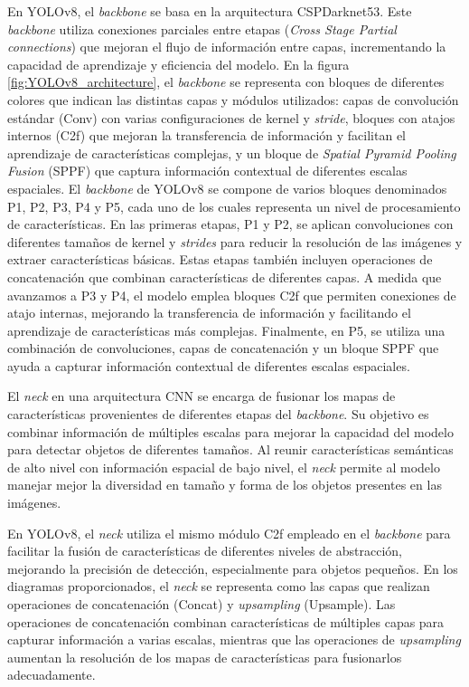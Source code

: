 En YOLOv8, el \textit{backbone} se basa en la arquitectura CSPDarknet53. Este \textit{backbone} utiliza conexiones parciales entre etapas (\textit{Cross Stage Partial connections}) que mejoran el flujo de información entre capas, incrementando la capacidad de aprendizaje y eficiencia del modelo. En la figura \ref{fig:YOLOv8_architecture}, el \textit{backbone} se representa con bloques de diferentes colores que indican las distintas capas y módulos utilizados: capas de convolución estándar (Conv) con varias configuraciones de kernel y \textit{stride}, bloques con atajos internos (C2f) que mejoran la transferencia de información y facilitan el aprendizaje de características complejas, y un bloque de \textit{Spatial Pyramid Pooling Fusion} (SPPF) que captura información contextual de diferentes escalas espaciales. El \textit{backbone} de YOLOv8 se compone de varios bloques denominados P1, P2, P3, P4 y P5, cada uno de los cuales representa un nivel de procesamiento de características. En las primeras etapas, P1 y P2, se aplican convoluciones con diferentes tamaños de kernel y \textit{strides} para reducir la resolución de las imágenes y extraer características básicas. Estas etapas también incluyen operaciones de concatenación que combinan características de diferentes capas. A medida que avanzamos a P3 y P4, el modelo emplea bloques C2f que permiten conexiones de atajo internas, mejorando la transferencia de información y facilitando el aprendizaje de características más complejas. Finalmente, en P5, se utiliza una combinación de convoluciones, capas de concatenación y un bloque SPPF que ayuda a capturar información contextual de diferentes escalas espaciales.

El \textit{neck} en una arquitectura CNN se encarga de fusionar los mapas de características provenientes de diferentes etapas del \textit{backbone}. Su objetivo es combinar información de múltiples escalas para mejorar la capacidad del modelo para detectar objetos de diferentes tamaños. Al reunir características semánticas de alto nivel con información espacial de bajo nivel, el \textit{neck} permite al modelo manejar mejor la diversidad en tamaño y forma de los objetos presentes en las imágenes.

En YOLOv8, el \textit{neck} utiliza el mismo módulo C2f empleado en el \textit{backbone} para facilitar la fusión de características de diferentes niveles de abstracción, mejorando la precisión de detección, especialmente para objetos pequeños. En los diagramas proporcionados, el \textit{neck} se representa como las capas que realizan operaciones de concatenación (Concat) y \textit{upsampling} (Upsample). Las operaciones de concatenación combinan características de múltiples capas para capturar información a varias escalas, mientras que las operaciones de \textit{upsampling} aumentan la resolución de los mapas de características para fusionarlos adecuadamente.

